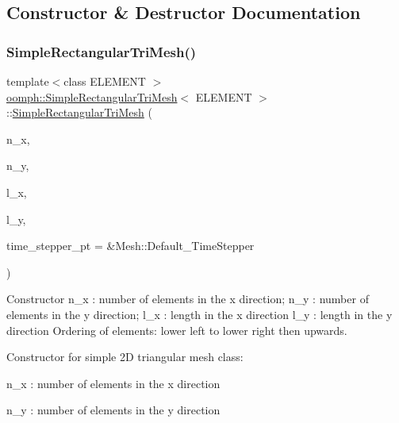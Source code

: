 \subsection{Constructor \& Destructor Documentation}
\mbox{\label{classoomph_1_1SimpleRectangularTriMesh_a4a4e728bd6245b820d4698de28ee7d38}} 
\subsubsection{\texorpdfstring{Simple\+Rectangular\+Tri\+Mesh()}{SimpleRectangularTriMesh()}}
{\footnotesize\ttfamily template$<$class E\+L\+E\+M\+E\+NT $>$ \\
\hyperlink{classoomph_1_1SimpleRectangularTriMesh}{oomph\+::\+Simple\+Rectangular\+Tri\+Mesh}$<$ E\+L\+E\+M\+E\+NT $>$\+::\hyperlink{classoomph_1_1SimpleRectangularTriMesh}{Simple\+Rectangular\+Tri\+Mesh} (\begin{DoxyParamCaption}\item[{const unsigned \&}]{n\+\_\+x,  }\item[{const unsigned \&}]{n\+\_\+y,  }\item[{const double \&}]{l\+\_\+x,  }\item[{const double \&}]{l\+\_\+y,  }\item[{Time\+Stepper $\ast$}]{time\+\_\+stepper\+\_\+pt = {\ttfamily \&Mesh\+:\+:Default\+\_\+TimeStepper} }\end{DoxyParamCaption})}



Constructor n\+\_\+x \+: number of elements in the x direction; n\+\_\+y \+: number of elements in the y direction; l\+\_\+x \+: length in the x direction l\+\_\+y \+: length in the y direction Ordering of elements\+: \textquotesingle{}lower left\textquotesingle{} to \textquotesingle{}lower right\textquotesingle{} then \textquotesingle{}upwards\textquotesingle{}. 

Constructor for simple 2D triangular mesh class\+:

n\+\_\+x \+: number of elements in the x direction

n\+\_\+y \+: number of elements in the y direction

